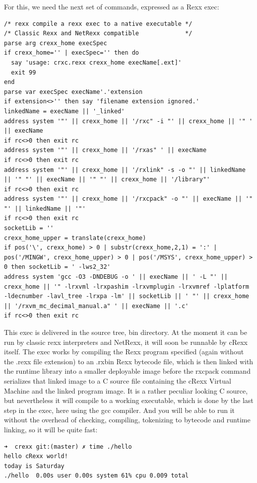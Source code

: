 For this, we need the next set of commands, expressed as a Rexx exec:

\begin{verbatim}
/* rexx compile a rexx exec to a native executable */
/* Classic Rexx and NetRexx compatible             */
parse arg crexx_home execSpec
if crexx_home='' | execSpec='' then do
  say 'usage: crxc.rexx crexx_home execName[.ext]'
  exit 99
end
parse var execSpec execName'.'extension
if extension<>'' then say 'filename extension ignored.'
linkedName = execName || '_linked'
address system '"' || crexx_home || '/rxc" -i "' || crexx_home || '" ' || execName
if rc<>0 then exit rc
address system '"' || crexx_home || '/rxas" ' || execName
if rc<>0 then exit rc
address system '"' || crexx_home || '/rxlink" -s -o "' || linkedName || '" "' || execName || '" "' || crexx_home || '/library"'
if rc<>0 then exit rc
address system '"' || crexx_home || '/rxcpack" -o "' || execName || '" "' || linkedName || '"'
if rc<>0 then exit rc
socketLib = ''
crexx_home_upper = translate(crexx_home)
if pos('\', crexx_home) > 0 | substr(crexx_home,2,1) = ':' | pos('/MINGW', crexx_home_upper) > 0 | pos('/MSYS', crexx_home_upper) > 0 then socketLib = ' -lws2_32'
address system 'gcc -O3 -DNDEBUG -o ' || execName || ' -L "' || crexx_home || '" -lrxvml -lrxpashim -lrxvmplugin -lrxvmref -lplatform -ldecnumber -lavl_tree -lrxpa -lm' || socketLib || ' "' || crexx_home || '/rxvm_mc_decimal_manual.a" ' || execName || '.c'
if rc<>0 then exit rc
\end{verbatim}

This exec is delivered in the source tree, bin directory. At the moment
it can be run by classic rexx interpreters and NetRexx, it will soon be
runnable by cRexx itself. The exec works by compiling the Rexx program
specified (again without the .rexx file extension) to an .rxbin Rexx
bytecode file, which is then linked with the runtime library into a
smaller deployable image before the rxcpack command serializes that
linked image to a C source file containing the cRexx Virtual Machine
and the linked program image. It is a rather peculiar looking C source,
but nevertheless it will compile to a working executable, which is done
by the last step in the exec, here using the gcc compiler. And you will
be able to run it without the overhead of checking, compiling,
tokenizing to bytecode and runtime linking, so it will be quite fast:

\begin{verbatim}
➜  crexx git:(master) ✗ time ./hello
hello cRexx world!
today is Saturday
./hello  0.00s user 0.00s system 61% cpu 0.009 total
\end{verbatim}
